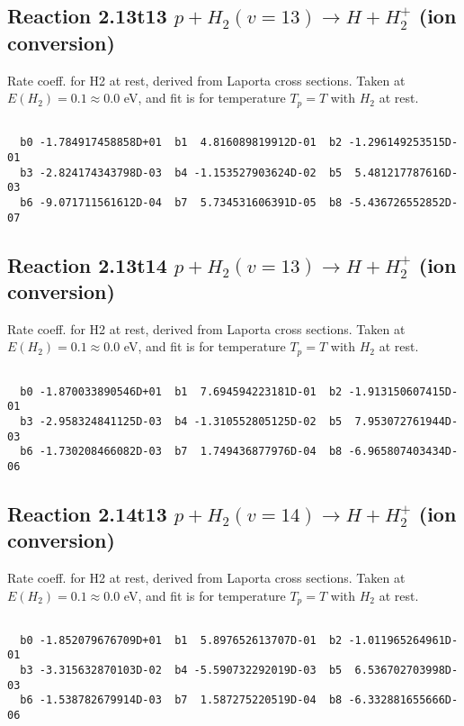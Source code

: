 \newpage
\subsection{
Reaction 2.13t13
$ p + H_2(v=13) \rightarrow H + H_2^+$ (ion conversion)
}
Rate coeff. for H2 at rest, derived from Laporta cross sections.
Taken at $E(H_2) = 0.1 \approx 0.0$ eV,  and fit is for temperature $T_p=T$ with $H_2$ at rest.

\begin{small}\begin{verbatim}

  b0 -1.784917458858D+01  b1  4.816089819912D-01  b2 -1.296149253515D-01
  b3 -2.824174343798D-03  b4 -1.153527903624D-02  b5  5.481217787616D-03
  b6 -9.071711561612D-04  b7  5.734531606391D-05  b8 -5.436726552852D-07

\end{verbatim}\end{small}

\newpage
\subsection{
Reaction 2.13t14
$ p + H_2(v=13) \rightarrow H + H_2^+$ (ion conversion)
}
Rate coeff. for H2 at rest, derived from Laporta cross sections.
Taken at $E(H_2) = 0.1 \approx 0.0$ eV,  and fit is for temperature $T_p=T$ with $H_2$ at rest.

\begin{small}\begin{verbatim}

  b0 -1.870033890546D+01  b1  7.694594223181D-01  b2 -1.913150607415D-01
  b3 -2.958324841125D-03  b4 -1.310552805125D-02  b5  7.953072761944D-03
  b6 -1.730208466082D-03  b7  1.749436877976D-04  b8 -6.965807403434D-06

\end{verbatim}\end{small}

\newpage
\subsection{
Reaction 2.14t13
$ p + H_2(v=14) \rightarrow H + H_2^+$ (ion conversion)
}
Rate coeff. for H2 at rest, derived from Laporta cross sections.
Taken at $E(H_2) = 0.1 \approx 0.0$ eV,  and fit is for temperature $T_p=T$ with $H_2$ at rest.

\begin{small}\begin{verbatim}

  b0 -1.852079676709D+01  b1  5.897652613707D-01  b2 -1.011965264961D-01
  b3 -3.315632870103D-02  b4 -5.590732292019D-03  b5  6.536702703998D-03
  b6 -1.538782679914D-03  b7  1.587275220519D-04  b8 -6.332881655666D-06

\end{verbatim}\end{small}

